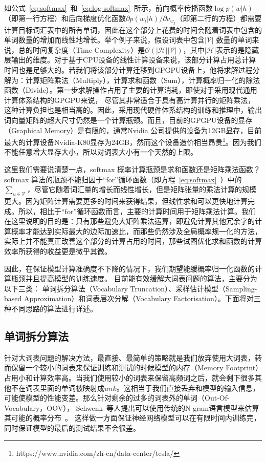 如公式~\ref{eq:softmax}~和~\ref{eq:log-softmax}~所示，前向概率传播函数$\log p(w|h) $（即第一行方程）和后向梯度优化函数${\partial p(w_i|h)}/{\partial v_{w_j}}$（即第二行的方程）都需要计算目标词汇表中的所有单词，因此在这个部分上花费的时间会随着词表中包含的单词数量的增加而线性地增长。举个例子来说，假设词表中包含$ \mathcal{| V |} $ 数量的单词来说，总的时间复杂度（Time Complexity）是$\mathcal{O}(\mathcal{|H ||V|})$，其中$\mathcal{|H|}$表示的是隐藏层输出的维度。对于基于CPU设备的线性计算设备来说，该部分计算占用总计算时间也是足够大的。若我们将该部分计算迁移到GPGPU设备上，他将求解过程分解为：计算矩阵乘法（Multiply），计算求和函数（Sum），计算概率归一化的除法函数（Divide）。第一步求解操作占用了主要的计算消耗，即使对于采用现代通用计算体系结构的GPGPU来说， 尽管其非常适合于具有高计算并行的矩阵乘法，这种计算负担也是相当高的。因此，采用现代硬件体系结构的训练和推理中，输出词向量矩阵的超大尺寸仍然是一个计算瓶颈。而且，目前的GPGPU设备的显存（Graphical Memory）是有限的，通常Nvidia 公司提供的设备为12GB显存，目前最大的计算设备Nvidia-K80显存为24GB，然而这个设备造价相当昂贵\footnote{https://www.nvidia.com/zh-cn/data-center/tesla/}。因为我们不能任意增大显存大小，所以对词表大小有一个天然的上限。

这里我们需要说清楚一点，softmax 概率计算瓶颈是求和函数还是矩阵乘法函数？ softmax 算法的瓶颈不能归因于``for''循环函数（即方程~\ref{eq:softmax}~）中的$ \sum_ {u \in \mathcal {V}} $，尽管它随着词汇量的增长而线性增长，但是矩阵张量的乘法计算的规模更大。因为矩阵计算需要更多的时间来获得结果，但线性求和可以更快地计算完成。所以，相比于``for''循环函数而言，主要的计算时间用于矩阵乘法计算。我们在这里说明的目的是：只有那些避免大矩阵乘法运算，即避免计算其他冗余字的计算概率才能达到实际最大的边际加速比，而那些仍然涉及全局概率规一化的方法，实际上并不能真正改善这个部分的计算占用的时间，那些试图优化求和函数的计算效率所获得的收益更是微乎其微。



因此，在保证模型计算准确度不下降的情况下，我们期望能缓概率归一化函数的计算瓶颈并且提高模型的训练速度。 目前能有效缓解大词表问题的算法，主要分为以下三类： 单词拆分算法（Vocabulary Truncation）、采样估计模型（Sampling-based Approximation）和词表层次分解（Vocabulary Factorisation）。下面将对三种不同思路的算法进行详述。


\subsection{单词拆分算法}
针对大词表问题的解决方法，最直接、最简单的策略就是我们放弃使用大词表，转而保留一个较小的词表来保证训练和测试的时候模型的内存（Memory Footprint）占用小和计算效率高。当我们使用较小的词表来保留高频词之后，就会剩下很多其他不在词表里面的单词被映射成$unk$。这相当于我们直接丢弃和模型的输入信息，可能使模型的性能变差。那么针对剩余的过多的词表外的单词（Out-Of-Vocabulary，OOV）， Schwenk~等人提出可以使用传统的N-gram语言模型来估算其可能的概率分布~。
这样做一方面保证神经网络模型可以在有限时间内训练完，同时保证模型的最后的测试结果不会很差。

